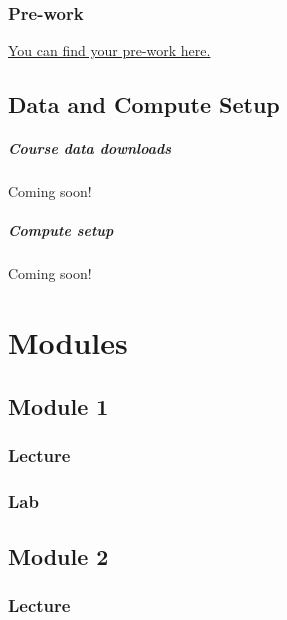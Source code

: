 \documentclass[
]{book}
\begin{document}
\section{Pre-work}\label{pre-work}

\href{https://docs.google.com/forms/d/e/1FAIpQLScewZhdlVSzXpY77kyWicauKDaEQy37RW4ZPZ9KNYWJyB03Mg/viewform}{You can find your pre-work here.}

\chapter{Data and Compute Setup}\label{data-and-compute-setup}

\subsubsection{Course data downloads}\label{course-data-downloads}

Coming soon!

\subsubsection{Compute setup}\label{compute-setup}

Coming soon!

\part{Modules}\label{part-modules}

\chapter{Module 1}\label{module-1}

\section{Lecture}\label{lecture}

\section{Lab}\label{lab}

\chapter{Module 2}\label{module-2}

\section{Lecture}\label{lecture-1}
\end{document}

